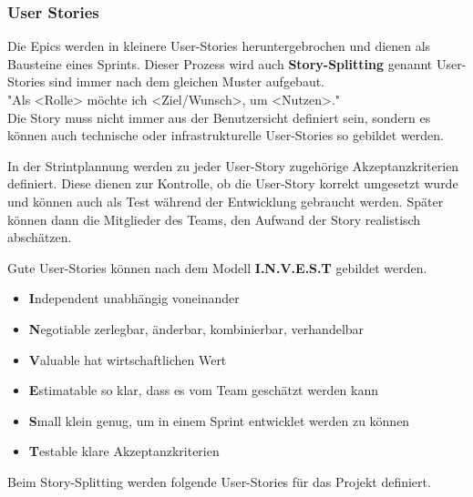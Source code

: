 \documentclass[a4paper, table]{article}
\begin{document}
\subsubsection{User Stories}
Die Epics werden in kleinere User-Stories heruntergebrochen und dienen als Bausteine eines Sprints.
Dieser Prozess wird auch \textbf{Story-Splitting} genannt
User-Stories sind immer nach dem gleichen Muster aufgebaut. \\
"Als <Rolle> möchte ich <Ziel/Wunsch>, um <Nutzen>." \\
Die Story muss nicht immer aus der Benutzersicht definiert sein, sondern es können auch technische oder
infrastrukturelle User-Stories so gebildet werden.

In der Strintplannung werden zu jeder User-Story zugehörige Akzeptanzkriterien definiert.
Diese dienen zur Kontrolle, ob die User-Story korrekt umgesetzt wurde und
können auch als Test während der Entwicklung gebraucht werden.
Später können dann die Mitglieder des Teams, den Aufwand der Story realistisch abschätzen.

Gute User-Stories können nach dem Modell \textbf{I.N.V.E.S.T} gebildet werden. \autocite{hammerschall_software_2013} %
\begin{itemize}
    \item \textbf{I}ndependent  unabhängig voneinander
    \item \textbf{N}egotiable   zerlegbar, änderbar, kombinierbar, verhandelbar
    \item \textbf{V}aluable     hat wirtschaftlichen Wert
    \item \textbf{E}stimatable  so klar, dass es vom Team geschätzt werden kann
    \item \textbf{S}mall        klein genug, um in einem Sprint entwicklet werden zu können
    \item \textbf{T}estable     klare Akzeptanzkriterien
\end{itemize}

Beim Story-Splitting werden folgende User-Stories für das Projekt definiert.
\end{document}
